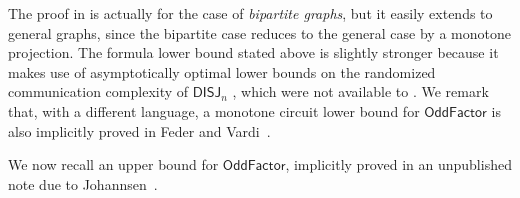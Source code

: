 \documentclass[10pt,a4paper]{article}
\newcommand{\OddFactor}{\mathsf{OddFactor}}
\begin{document}
The proof in \cite{DBLP:journals/combinatorica/BabaiGW99}  is actually for the case of
\emph{bipartite graphs}, but it easily extends to general graphs, since
the bipartite case reduces to the general case by a monotone projection.
The formula lower bound stated above is slightly stronger because it makes
use of asymptotically optimal lower bounds on the randomized communication
complexity of $\mathsf{DISJ}_n$
\citep{DBLP:journals/siamdm/KalyanasundaramS92}, which were not available
to \cite{DBLP:journals/combinatorica/BabaiGW99}. We remark that, with a
different language,
a monotone circuit lower bound for $\OddFactor$ is also implicitly proved
in Feder and
Vardi~\cite[Theorem 30]{DBLP:journals/siamcomp/FederV98}.



We now recall an upper bound for $\OddFactor$,  implicitly proved
in an unpublished note due to Johannsen~\cite{joh03}.
\end{document}
